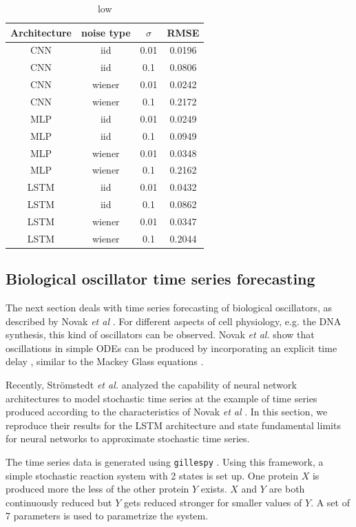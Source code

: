 \documentclass{article}
\begin{document}
\begin{table} 
  \centering  
  \begin{tabular}{c|c|c|c}
    Architecture & noise type & $\sigma$ & RMSE \\
    \hline
    CNN & iid & 0.01 & 0.0196 \\
    CNN & iid & 0.1 & 0.0806 \\ 
    CNN & wiener & 0.01 & 0.0242 \\
    CNN & wiener & 0.1 & 0.2172 \\
    MLP & iid & 0.01 & 0.0249 \\
    MLP & iid & 0.1 & 0.0949 \\
    MLP & wiener & 0.01 & 0.0348 \\
    MLP & wiener & 0.1 & 0.2162 \\
    LSTM & iid & 0.01 & 0.0432 \\
    LSTM & iid & 0.1 & 0.0862 \\
    LSTM & wiener & 0.01 & 0.0347 \\
    LSTM & wiener & 0.1 & 0.2044 \\
  \end{tabular}
  \caption{low}
  \label{tab:mackey_noise}
\end{table}

\subsection{Biological oscillator time series forecasting}

The next section deals with time series forecasting of biological oscillators,
as described by Novak \textit{et al} \cite{novak2008}. For different aspects of
cell physiology, e.g. the DNA synthesis, this kind of oscillators can be
observed. Novak \textit{et al.} show that oscillations in simple ODEs can be
produced by incorporating an explicit time delay \cite{novak2008}, similar to
the Mackey Glass equations \cite{mackey1977}.

Recently, Strömstedt \textit{et al.} analyzed the capability of neural network
architectures to model stochastic time series \cite{stroemstedt2018} at the
example of time series produced according to the characteristics of Novak
\textit{et al} \cite{novak2008}. In this section, we reproduce their results for
the LSTM architecture and state fundamental limits for neural networks to
approximate stochastic time series.

The time series data is generated using \texttt{gillespy} \cite{abel2016}.
Using this framework, a simple stochastic reaction system with 2 states is
set up. One protein $X$ is produced more the less of the other protein $Y$
exists. $X$ and $Y$ are both continuously reduced but $Y$ gets reduced stronger
for smaller values of $Y$. A set of 7 parameters is used to parametrize the
system.
\end{document}
